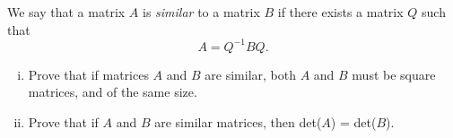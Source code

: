 \begin{question}
	\normalfont We say that a matrix $A$ is \emph{similar} to a matrix $B$ if there exists a matrix $Q$ such that 
	\[
	A = Q^{-1}BQ.
	\]
	\vspace{.1cm}
	\begin{enumerate}[(i)]
	\item Prove that if matrices $A$ and $B$ are similar, both $A$ and $B$ must be square matrices, and of the same size. 
	\vspace{.1cm}
	
\item	Prove that if $A$ and $B$ are similar matrices, then det($A$) = det($B$). 
	\end{enumerate}
		
	\end{question}